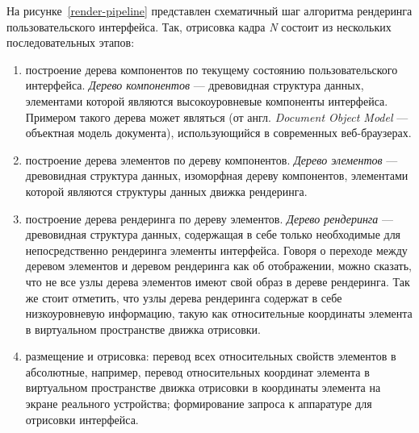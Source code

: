 На рисунке~\ref{render-pipeline} представлен схематичный шаг алгоритма
рендеринга пользовательского интерфейса. Так, отрисовка кадра \textit{N}
состоит из нескольких последовательных этапов:
\begin{enumerate}
	\item построение дерева компонентов по текущему состоянию
	пользовательского интерфейса. \textit{Дерево компонентов} ---
	древовидная структура данных, элементами которой являются
	высокоуровневые компоненты интерфейса. Примером такого дерева
	может являться  (от англ. \textit{Document Object Model} ---
	объектная модель документа), использующийся в современных веб-браузерах.
	\item построение дерева элементов по дереву компонентов. \textit{Дерево
	элементов} --- древовидная структура данных, изоморфная дереву
	компонентов, элементами которой являются структуры данных движка
	рендеринга.
	\item построение дерева рендеринга по дереву элементов. \textit{Дерево
	рендеринга} --- древовидная структура данных, содержащая в себе только
	необходимые для непосредственно рендеринга элементы интерфейса. Говоря
	о переходе между деревом элементов и деревом рендеринга как об
	отображении, можно сказать, что не все узлы дерева элементов имеют
	свой образ в дереве рендеринга. Так же стоит отметить, что узлы дерева
	рендеринга содержат в себе низкоуровневую информацию, такую как
	относительные координаты элемента в виртуальном пространстве движка
	отрисовки.
	\item размещение и отрисовка: перевод всех относительных свойств
	элементов в абсолютные, например, перевод относительных координат
	элемента в виртуальном пространстве движка отрисовки в координаты
	элемента на экране реального устройства; формирование запроса к
	аппаратуре для отрисовки интерфейса.
\end{enumerate}


